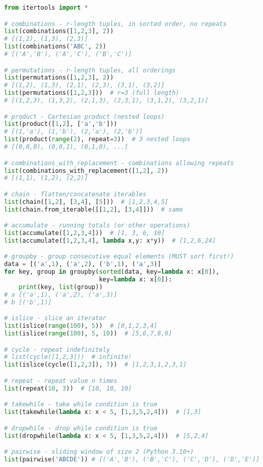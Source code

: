 \documentclass[8pt,landscape]{article}
\begin{document}
\begin{multicols}{3}
\begin{lstlisting}[language=Python]
from itertools import *

# combinations - r-length tuples, in sorted order, no repeats
list(combinations([1,2,3], 2))
# [(1,2), (1,3), (2,3)]
list(combinations('ABC', 2))
# [('A','B'), ('A','C'), ('B','C')]

# permutations - r-length tuples, all orderings
list(permutations([1,2,3], 2))
# [(1,2), (1,3), (2,1), (2,3), (3,1), (3,2)]
list(permutations([1,2,3]))  # r=3 (full length)
# [(1,2,3), (1,3,2), (2,1,3), (2,3,1), (3,1,2), (3,2,1)]

# product - Cartesian product (nested loops)
list(product([1,2], ['a','b']))
# [(1,'a'), (1,'b'), (2,'a'), (2,'b')]
list(product(range(2), repeat=3))  # 3 nested loops
# [(0,0,0), (0,0,1), (0,1,0), ...]

# combinations_with_replacement - combinations allowing repeats
list(combinations_with_replacement([1,2], 2))
# [(1,1), (1,2), (2,2)]

# chain - flatten/concatenate iterables
list(chain([1,2], [3,4], [5]))  # [1,2,3,4,5]
list(chain.from_iterable([[1,2], [3,4]]))  # same

# accumulate - running totals (or other operations)
list(accumulate([1,2,3,4]))  # [1, 3, 6, 10]
list(accumulate([1,2,3,4], lambda x,y: x*y))  # [1,2,6,24]

# groupby - group consecutive equal elements (MUST sort first!)
data = [('a',1), ('a',2), ('b',1), ('a',3)]
for key, group in groupby(sorted(data, key=lambda x: x[0]),
                          key=lambda x: x[0]):
    print(key, list(group))
# a [('a',1), ('a',2), ('a',3)]
# b [('b',1)]

# islice - slice an iterator
list(islice(range(100), 5))  # [0,1,2,3,4]
list(islice(range(100), 5, 10))  # [5,6,7,8,9]

# cycle - repeat indefinitely
# list(cycle([1,2,3]))  # infinite!
list(islice(cycle([1,2,3]), 7))  # [1,2,3,1,2,3,1]

# repeat - repeat value n times
list(repeat(10, 3))  # [10, 10, 10]

# takewhile - take while condition is true
list(takewhile(lambda x: x < 5, [1,3,5,2,4]))  # [1,3]

# dropwhile - drop while condition is true
list(dropwhile(lambda x: x < 5, [1,3,5,2,4]))  # [5,2,4]

# pairwise - sliding window of size 2 (Python 3.10+)
list(pairwise('ABCDE')) # [('A','B'), ('B','C'), ('C','D'), ('D','E')]
\end{lstlisting}


\end{multicols}
\end{document}
